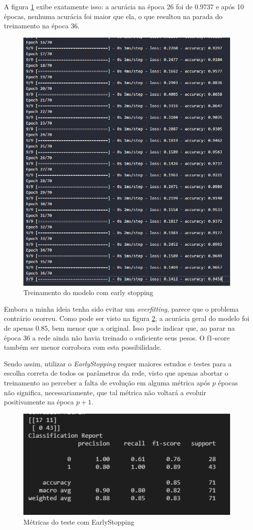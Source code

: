 \documentclass[12pt]{article}
\begin{document}
A figura \ref{fig:fitearly} exibe exatamente isso: a acurácia na época 26 foi de 0.9737 e após 10 épocas, nenhuma acurácia foi maior que ela, o que resultou na parada do treinamento na época 36.
\begin{figure}[H]
	\centering
	\includegraphics[width=0.7\linewidth]{Imagens/earlystopping/fitearly}
	\caption{Treinamento do modelo com early stopping}
	\label{fig:fitearly}
\end{figure}

Embora a minha ideia tenha sido evitar um \textit{overfitting}, parece que o problema contrário ocorreu. Como pode ser visto na figura \ref{fig:metricasearly}, a acurácia geral do modelo foi de apenas 0.85, bem menor que a original. Isso pode indicar que, ao parar na época 36 a rede ainda não havia treinado o suficiente seus pesos. O f1-score também ser menor corrobora com esta possibilidade.

Sendo assim, utilizar o \textit{EarlyStopping} requer maiores estudos e testes para a escolha correta de todos os parâmetros da rede, visto que apenas abortar o treinamento ao perceber a falta de evolução em alguma métrica após $p$ épocas não significa, necessariamente, que tal métrica não voltará a evoluir positivamente na época $p+1$.
\begin{figure}[H]
	\centering
	\includegraphics[width=0.7\linewidth]{Imagens/earlystopping/metricasearly}
	\caption{Métricas do teste com EarlyStopping}
	\label{fig:metricasearly}
\end{figure}
\end{document}
